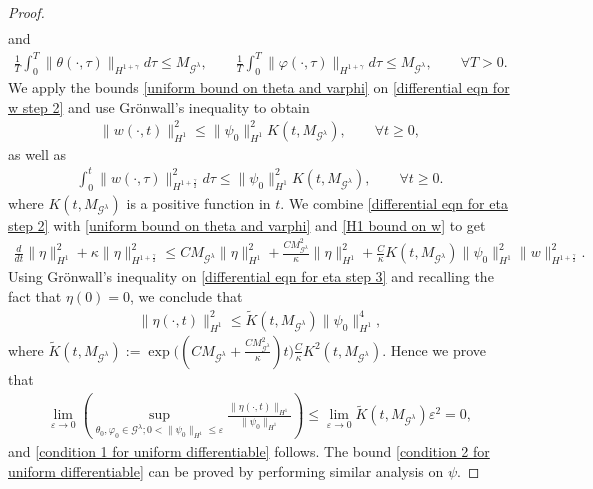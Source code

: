 \documentclass[reqno]{amsart}%
\theoremstyle{definition}
\theoremstyle{remark}
\numberwithin{equation}{section}
\newcommand{\1}{\mathbf{1}}
\newcommand{\Gg}{\mathcal{G}^{\lambda}}
\numberwithin{equation}{section}
\numberwithin{theorem}{section}
\numberwithin{figure}{section}
\begin{document}
\begin{proof}
\begin{align}
\end{align}
and
\begin{align}\label{uniform bound on time integral of theta and varphi}
\frac{1}{T}\int_0^{T}\|\theta(\cdot,\tau)\|_{H^{1+\gamma}}d\tau\le M_{\Gg},\qquad \frac{1}{T}\int_0^{T}\|\varphi(\cdot,\tau)\|_{H^{1+\gamma}}d\tau\le M_{\Gg},\qquad\forall T>0.
\end{align}
We apply the bounds \eqref{uniform bound on theta and varphi} on \eqref{differential eqn for w step 2} and use Gr\"{o}nwall's inequality to obtain
\begin{align}\label{H1 bound on w}
\|w(\cdot,t)\|^2_{H^1}\le\|\psi_0\|^2_{H^1}K(t,M_{\Gg}),\qquad\forall t\ge0,
\end{align}
as well as 
\begin{align}\label{time integral on H 1+gamma/2 norm of w}
\int_0^t\|w(\cdot,\tau)\|^2_{H^{1+\frac{\gamma}{2}}}d\tau\le\|\psi_0\|^2_{H^1}K(t,M_{\Gg}),\qquad\forall t\ge0.
\end{align}
where $K(t,M_{\Gg})$ is a positive function in $t$. We combine \eqref{differential eqn for eta step 2} with \eqref{uniform bound on theta and varphi} and \eqref{H1 bound on w} to get
\begin{align}\label{differential eqn for eta step 3}
\frac{d}{dt}\|\eta\|^2_{H^1}+\kappa\|\eta\|^2_{H^{1+\frac{\gamma}{2}}}\le CM_{\Gg}\|\eta\|^2_{H^1}+\frac{CM^2_{\Gg}}{\kappa}\|\eta\|^2_{H^1}+\frac{C}{\kappa}K(t,M_{\Gg})\|\psi_0\|^2_{H^1}\|w\|^2_{H^{1+\frac{\gamma}{2}}}.
\end{align}
Using Gr\"{o}nwall's inequality on \eqref{differential eqn for eta step 3} and recalling the fact that $\eta(0)=0$, we conclude that
\begin{align*}
\|\eta(\cdot,t)\|^2_{H^1}\le \tilde K(t,M_{\Gg})\|\psi_0\|^4_{H^1},
\end{align*}
where $\tilde K(t,M_{\Gg}):=\exp\Big((CM_{\Gg}+\frac{CM^2_{\Gg}}{\kappa})t\Big)\frac{C}{\kappa}K^2(t,M_{\Gg})$. Hence we prove that
\begin{align*}
\lim_{\varepsilon\to0}\left(\sup_{\theta_0,\varphi_0\in\Gg;0<\|\psi_0\|_{H^1}\le\varepsilon}\frac{\|\eta(\cdot,t)\|_{H^1}}{\|\psi_0\|_{H^1}}\right)\le \lim_{\varepsilon\to0}\tilde K(t,M_{\Gg})\varepsilon^2=0,
\end{align*}
and \eqref{condition 1 for uniform differentiable} follows. The bound \eqref{condition 2 for uniform differentiable} can be proved by performing similar analysis on $\psi$.


\end{proof}
\end{document}
